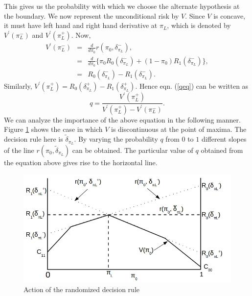 \documentclass[a4paper,english,12pt]{article}
\begin{document}
This gives us the probability with which we choose the alternate hypothesis at the boundary. We now represent the unconditional risk by $V$. Since $V$ is concave, it must have left hand and right hand derivative at $\pi_L$, which is denoted by $V^{'}(\pi_L^{-})$ and $V^{'}(\pi_L^{+})$. Now,
\begin{eqnarray}
V^{'}(\pi_L^{-}) &=& \frac{d}{d \pi_0} r(\pi_0 , \delta_{\pi_L}^{-}), \nonumber \\
&=& \frac{d}{d\pi_0}\{\pi_0 R_0(\delta_{\pi_L}^{-}) + (1-\pi_0)R_1(\delta_{\pi_L}^{-}) \}, \nonumber \\
&=& R_0(\delta_{\pi_L}^{-}) - R_1(\delta_{\pi_L}^{-}). 
\end{eqnarray}
Similarly, $V^{'}(\pi_L^{+}) = R_0(\delta_{\pi_L}^{+}) - R_1(\delta_{\pi_L}^{+})$. Hence eqn. (\ref{qeq}) can be written as
\begin{equation}
q = \frac{V^{'}(\pi_L^{+})}{V^{'}(\pi_L^{+}) - V^{'}(\pi_L^{-})}.
\end{equation}
We can analyze the importance of the above equation in the following manner. Figure \ref{fig:DecisionRules} shows the case in which $V$ is discontinuous at the point of maxima. The decision rule here is ${{\tilde \delta}_{\pi_L}}$. By varying the probability $q$ from $0$ to $1$ different slopes of the line $r(\pi_0, {{\tilde \delta}_{\pi_L}})$ can be obtained. The particular value of $q$ obtained from the equation above gives rise to the horizontal line.   
\begin{figure}[h]
\centering
\includegraphics[width=0.7\linewidth]{Figures/Lec3_Fig1.jpg}
\caption[rdr]{Action of the randomized decision rule}
\label{fig:DecisionRules}
\end{figure}
\end{document}
